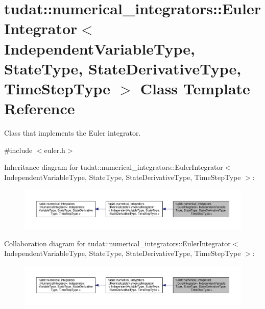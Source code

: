 \hypertarget{classtudat_1_1numerical__integrators_1_1EulerIntegrator}{}\section{tudat\+:\+:numerical\+\_\+integrators\+:\+:Euler\+Integrator$<$ Independent\+Variable\+Type, State\+Type, State\+Derivative\+Type, Time\+Step\+Type $>$ Class Template Reference}
\label{classtudat_1_1numerical__integrators_1_1EulerIntegrator}


Class that implements the Euler integrator.  




{\ttfamily \#include $<$euler.\+h$>$}



Inheritance diagram for tudat\+:\+:numerical\+\_\+integrators\+:\+:Euler\+Integrator$<$ Independent\+Variable\+Type, State\+Type, State\+Derivative\+Type, Time\+Step\+Type $>$\+:
\nopagebreak
\begin{figure}[H]
\begin{center}
\leavevmode
\includegraphics[width=350pt]{classtudat_1_1numerical__integrators_1_1EulerIntegrator__inherit__graph}
\end{center}
\end{figure}


Collaboration diagram for tudat\+:\+:numerical\+\_\+integrators\+:\+:Euler\+Integrator$<$ Independent\+Variable\+Type, State\+Type, State\+Derivative\+Type, Time\+Step\+Type $>$\+:
\nopagebreak
\begin{figure}[H]
\begin{center}
\leavevmode
\includegraphics[width=350pt]{classtudat_1_1numerical__integrators_1_1EulerIntegrator__coll__graph}
\end{center}
\end{figure}
